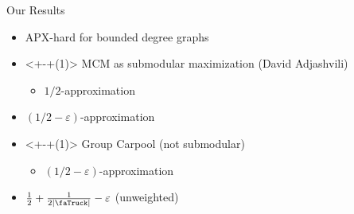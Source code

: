 \begin{frame}[<+>]{Our Results}
\begin{itemize}
  	\item APX-hard for bounded degree graphs 
	\item<+-+(1)> MCM as submodular maximization (David Adjashvili) 
		\begin{itemize}
		  \item $1/2$-approximation 
		\end{itemize}
	\item $(1/2 - \varepsilon)$-approximation 
	\item<+-+(1)> Group Carpool (not submodular)
		\begin{itemize}
			\item $(1/2 - \varepsilon)$-approximation
		\end{itemize}
	\item $\frac{1}{2} + \frac{1}{2|\text{\faTruck}|} - \varepsilon$ (unweighted)
\end{itemize}
\end{frame}